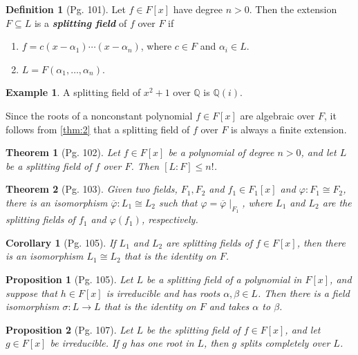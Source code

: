 \documentclass[leqno]{article}
\newtheorem{theorem}{Theorem}
\newtheorem{corollary}{Corollary}
\theoremstyle{definition}
\newtheorem{prop}{Proposition}
\newtheorem{definition}{Definition}
\theoremstyle{remark}
\theoremstyle{definition}
\newtheorem{example}{Example}
\begin{document}
    \begin{definition}[Pg. 101]\label{def:6}
        Let $f\in F[x]$ have degree $n>0$. Then the extension $F\subseteq L$ is a \textbf{\textit{splitting field}} of $f$ over $F$ if 
            \begin{enumerate}[label=\normalfont{(\alph*)}]
                \item $f=c(x-\alpha_1)\cdots(x-\alpha_n)$, where $c\in F$ and $\alpha_i\in L$.
                \item $L=F(\alpha_1,\dots,\alpha_n)$.
            \end{enumerate}
    \end{definition}
    \begin{example}\label{ex:1}
        A splitting field of $x^2+1$ over $\mathbb{Q}$ is $\mathbb{Q}(i)$.
    \end{example}
    Since the roots of a nonconstant polynomial $f\in F[x]$ are algebraic over $F$, it follows from \cref{thm:2} that a splitting field of $f$ over $F$ is always a finite extension.
    \begin{theorem}[Pg. 102]\label{thm:3}
        Let $f\in F[x]$ be a polynomial of degree $n>0$, and let $L$ be a splitting field of $f$ over $F$. Then $[L\colon F]\leq n!$.
    \end{theorem}
    \begin{theorem}[Pg. 103]\label{thm:4}
        Given two fields, $F_1, F_2$ and $f_1\in F_1[x]$ and $\varphi\colon F_1\cong F_2$, there is an isomorphism $\overline{\varphi}\colon L_1\cong L_2$ such that $\varphi=\overline{\varphi}\mid_{F_1}$, where $L_1$ and $L_2$ are the splitting fields of $f_1$ and $\varphi(f_1)$, respectively.
    \end{theorem}
    \begin{corollary}[Pg. 105]\label{cor:1}
        If $L_1$ and $L_2$ are splitting fields of $f\in F[x]$, then there is an isomorphism $L_1\cong L_2$ that is the identity on $F$.
    \end{corollary}
    \begin{prop}[Pg. 105]\label{prop:1}
        \textit{Let $L$ be a splitting field of a polynomial in $F[x]$, and suppose that $h\in F[x]$ is irreducible and has roots $\alpha,\beta\in L$. Then there is a field isomorphism $\sigma\colon L\rightarrow L$ that is the identity on $F$ and takes $\alpha$ to $\beta$.}
    \end{prop}
    \begin{prop}[Pg. 107]\label{prop:2}
        \textit{Let $L$ be the splitting field of $f\in F[x]$, and let $g\in F[x]$ be irreducible. If $g$ has one root in $L$, then $g$ splits completely over $L$.}
    \end{prop}
\end{document}
